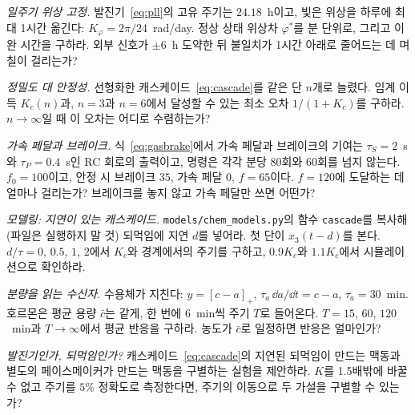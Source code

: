 \begin{exercise}[\lvlA]
\label{ex:16:2}
\emph{일주기 위상 고정.} 발진기~\eqref{eq:pll}의 고유 주기는 $24.18$~h이고, 빛은 위상을 하루에 최대 1시간 옮긴다: $K_\varphi=2\pi/24$~rad/day. 정상 상태 위상차 $\varphi^*$를 분 단위로, 그리고 이완 시간을 구하라. 외부 신호가 $\pm6$~h 도약한 뒤 불일치가 1시간 아래로 줄어드는 데 며칠이 걸리는가?
\end{exercise}

\begin{exercise}[\lvlB]
\label{ex:16:3}
\emph{정밀도 대 안정성.} 선형화한 캐스케이드~\eqref{eq:cascade}를 같은 단 $n$개로 늘렸다. 임계 이득 $K_c(n)$과, $n=3$과 $n=6$에서 달성할 수 있는 최소 오차 $1/(1+K_c)$를 구하라. $n\to\infty$일 때 이 오차는 어디로 수렴하는가?
\end{exercise}

\begin{exercise}[\lvlB]
\label{ex:16:4}
\emph{가속 페달과 브레이크.} 식~\eqref{eq:gasbrake}에서 가속 페달과 브레이크의 기여는 $\tau_S=2$~s와 $\tau_P=0.4$~s인 RC 회로의 출력이고, 명령은 각각 분당 $80$회와 $60$회를 넘지 않는다. $f_0=100$이고, 안정 시 브레이크 $35$, 가속 페달 $0$, $f=65$이다. $f=120$에 도달하는 데 얼마나 걸리는가? 브레이크를 놓지 않고 가속 페달만 쓰면 어떤가?
\end{exercise}

\begin{exercise}[\lvlB]
\label{ex:16:5}
\emph{모델링: 지연이 있는 캐스케이드.} \texttt{models/\allowbreak chem\_models.py}의 함수 \texttt{cascade}를 복사해(파일은 실행하지 말 것) 되먹임에 지연 $d$를 넣어라. 첫 단이 $x_3(t-d)$를 본다. $d/\tau=0$, $0.5$, $1$, $2$에서 $K_c$와 경계에서의 주기를 구하고, $0.9K_c$와 $1.1K_c$에서 시뮬레이션으로 확인하라.
\end{exercise}

\begin{exercise}[\lvlB]
\label{ex:16:6}
\emph{분량을 읽는 수신자.} 수용체가 지친다: $y=[c-a]_+$, $\tau_a\,\dd a/\dd t=c-a$, $\tau_a=30$~min. 호르몬은 평균 용량 $\bar c$는 같게, 한 번에 $6$~min씩 주기 $T$로 들어온다. $T=15$, $60$, $120$~min과 $T\to\infty$에서 평균 반응을 구하라. 농도가 $\bar c$로 일정하면 반응은 얼마인가?
\end{exercise}

\begin{exercise}[\lvlC]
\label{ex:16:7}
\emph{발진기인가, 되먹임인가?} 캐스케이드~\eqref{eq:cascade}의 지연된 되먹임이 만드는 맥동과 별도의 페이스메이커가 만드는 맥동을 구별하는 실험을 제안하라. $K$를 1.5배밖에 바꿀 수 없고 주기를 $5\%$ 정확도로 측정한다면, 주기의 이동으로 두 가설을 구별할 수 있는가?
\end{exercise}

